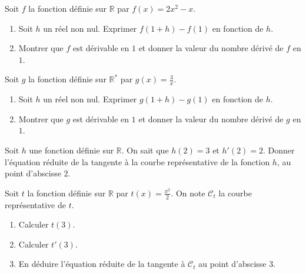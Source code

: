 \documentclass[11pt]{article}
\begin{document}
\begin{exo}
  Soit $f$ la fonction définie sur $\mathbb{R}$ par $f(x) = 2x^2-x$.
  \begin{enumerate}
    \item Soit $h$ un réel non nul. Exprimer $f(1+h)-f(1)$ en fonction de $h$.
    \item Montrer que $f$ est dérivable en $1$ et donner la valeur du nombre
      dérivé de $f$ en $1$.
  \end{enumerate}
\end{exo}

\begin{exo}
  Soit $g$ la fonction définie sur $\mathbb{R}^*$ par $g(x) = \frac{3}{x}$.
  \begin{enumerate}
    \item Soit $h$ un réel non nul. Exprimer $g(1+h)-g(1)$ en fonction de $h$.
    \item Montrer que $g$ est dérivable en $1$ et donner la valeur du nombre
      dérivé de $g$ en $1$.
  \end{enumerate}
\end{exo}

\begin{exo}
  Soit $h$ une fonction définie sur $\mathbb{R}$. On sait que $h(2)=3$ et
  $h'(2)=2$. Donner l'équation réduite de la tangente à la courbe représentative
  de la fonction $h$, au point d'abscisse $2$.
\end{exo}

\begin{exo}
  Soit $t$ la fonction définie sur $\mathbb{R}$ par $t(x) = \frac{x^2}{2}$. On
  note $\mathcal C_t$ la courbe représentative de $t$.
  \begin{enumerate}
    \item Calculer $t(3)$.
    \item Calculer $t'(3)$.
    \item En déduire l'équation réduite de la tangente à 
      $\mathcal C_t$ au point d'abscisse $3$.
  \end{enumerate}
\end{exo}
\end{document}
